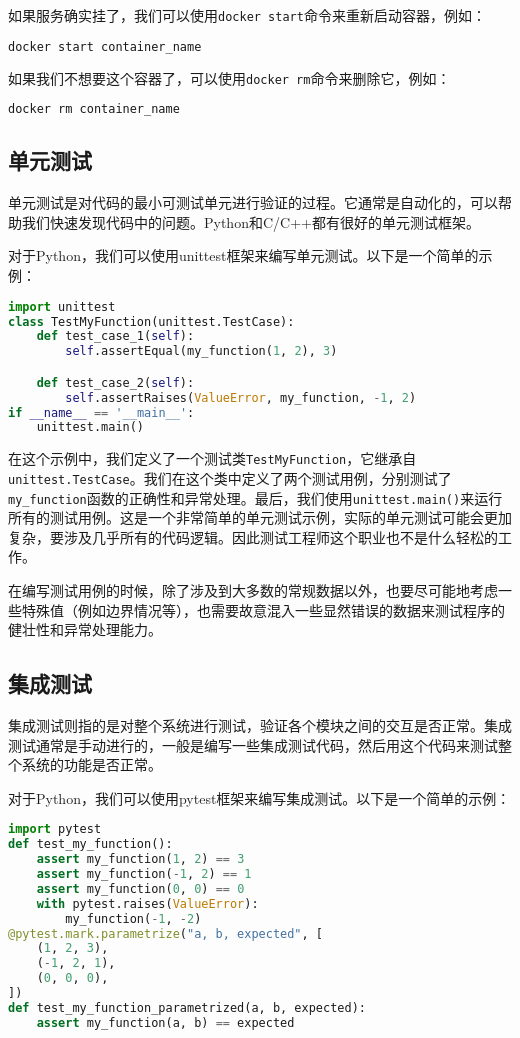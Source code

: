 如果服务确实挂了，我们可以使用\texttt{docker start}命令来重新启动容器，例如：
\begin{lstlisting}[language=bash]
    docker start container_name
\end{lstlisting}

如果我们不想要这个容器了，可以使用\texttt{docker rm}命令来删除它，例如：
\begin{lstlisting}[language=bash]
    docker rm container_name
\end{lstlisting}

\subsection{单元测试}

单元测试是对代码的最小可测试单元进行验证的过程。它通常是自动化的，可以帮助我们快速发现代码中的问题。Python和C/C++都有很好的单元测试框架。

对于Python，我们可以使用unittest框架来编写单元测试。以下是一个简单的示例：
\begin{lstlisting}[language=python]
import unittest
class TestMyFunction(unittest.TestCase):
    def test_case_1(self):
        self.assertEqual(my_function(1, 2), 3)

    def test_case_2(self):
        self.assertRaises(ValueError, my_function, -1, 2)
if __name__ == '__main__':
    unittest.main()
\end{lstlisting}
在这个示例中，我们定义了一个测试类\texttt{TestMyFunction}，它继承自\texttt{unittest.TestCase}。我们在这个类中定义了两个测试用例，分别测试了\texttt{my\_function}函数的正确性和异常处理。最后，我们使用\texttt{unittest.main()}来运行所有的测试用例。这是一个非常简单的单元测试示例，实际的单元测试可能会更加复杂，要涉及几乎所有的代码逻辑。因此测试工程师这个职业也不是什么轻松的工作。

在编写测试用例的时候，除了涉及到大多数的常规数据以外，也要尽可能地考虑一些特殊值（例如边界情况等），也需要故意混入一些显然错误的数据来测试程序的健壮性和异常处理能力。

\subsection{集成测试}

集成测试则指的是对整个系统进行测试，验证各个模块之间的交互是否正常。集成测试通常是手动进行的，一般是编写一些集成测试代码，然后用这个代码来测试整个系统的功能是否正常。

对于Python，我们可以使用pytest框架来编写集成测试。以下是一个简单的示例：
\begin{lstlisting}[language=python]
import pytest
def test_my_function():
    assert my_function(1, 2) == 3
    assert my_function(-1, 2) == 1
    assert my_function(0, 0) == 0
    with pytest.raises(ValueError):
        my_function(-1, -2)
@pytest.mark.parametrize("a, b, expected", [
    (1, 2, 3),
    (-1, 2, 1),
    (0, 0, 0),
])
def test_my_function_parametrized(a, b, expected):
    assert my_function(a, b) == expected
\end{lstlisting}

